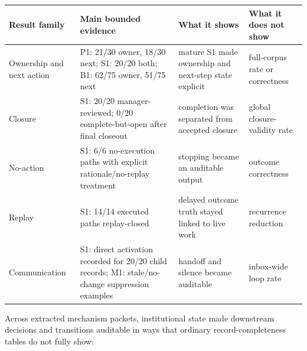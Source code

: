 \documentclass[
]{article}
\newcounter{none} %
\begin{document}
{\def\LTcaptype{none} %
\begin{longtable}[]{@{}
  >{\raggedright\arraybackslash}p{}
  >{\raggedright\arraybackslash}p{}
  >{\raggedright\arraybackslash}p{}
  >{\raggedright\arraybackslash}p{}@{}}
\toprule\noalign{}
\begin{minipage}[b]{\linewidth}\raggedright
Result family
\end{minipage} & \begin{minipage}[b]{\linewidth}\raggedright
Main bounded evidence
\end{minipage} & \begin{minipage}[b]{\linewidth}\raggedright
What it shows
\end{minipage} & \begin{minipage}[b]{\linewidth}\raggedright
What it does not show
\end{minipage} \\
\midrule\noalign{}
\endhead
\bottomrule\noalign{}
\endlastfoot
Ownership and next action & P1: 21/30 owner, 18/30 next; S1: 20/20 both; B1: 62/75 owner, 51/75 next & mature S1 made ownership and next-step state explicit & full-corpus rate or correctness \\
Closure & S1: 20/20 manager-reviewed; 0/20 complete-but-open after final closeout & completion was separated from accepted closure & global closure-validity rate \\
No-action & S1: 6/6 no-execution paths with explicit rationale/no-replay treatment & stopping became an auditable output & outcome correctness \\
Replay & S1: 14/14 executed paths replay-closed & delayed outcome truth stayed linked to live work & recurrence reduction \\
Communication & S1: direct activation recorded for 20/20 child records; M1: stale/no-change suppression examples & handoff and silence became auditable & inbox-wide loop rate \\
\end{longtable}
}

Across extracted mechanism packets, institutional state made downstream decisions and transitions auditable in ways that ordinary record-completeness tables do not fully show:
\end{document}
